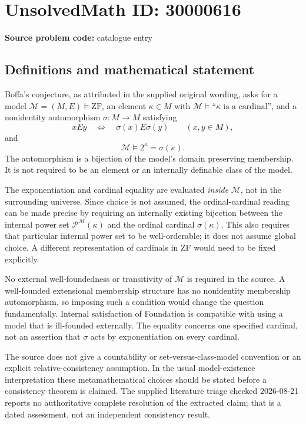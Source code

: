 \documentclass[11pt]{article}
\begin{document}
\section*{UnsolvedMath ID: 30000616}
\textbf{Source problem code:} catalogue entry
\subsection{Definitions and mathematical statement}
Boffa's conjecture, as attributed in the supplied original wording, asks for a model \(\mathcal M=(M,E)\models\mathrm{ZF}\), an element \(\kappa\in M\) with \(\mathcal M\models\text{``}\kappa\text{ is a cardinal''}\), and a nonidentity automorphism \(\sigma:M\to M\) satisfying
\[
xEy\quad\Longleftrightarrow\quad\sigma(x)E\sigma(y)
\qquad(x,y\in M),
\]
and
\[
\mathcal M\models 2^\kappa=\sigma(\kappa).
\]
The automorphism is a bijection of the model's domain preserving membership. It is not required to be an element or an internally definable class of the model.

The exponentiation and cardinal equality are evaluated \emph{inside} \(\mathcal M\), not in the surrounding universe. Since choice is not assumed, the ordinal-cardinal reading can be made precise by requiring an internally existing bijection between the internal power set \(\mathcal P^{\mathcal M}(\kappa)\) and the ordinal cardinal \(\sigma(\kappa)\). This also requires that particular internal power set to be well-orderable; it does not assume global choice. A different representation of cardinals in ZF would need to be fixed explicitly.

No external well-foundedness or transitivity of \(\mathcal M\) is required in the source. A well-founded extensional membership structure has no nonidentity membership automorphism, so imposing such a condition would change the question fundamentally. Internal satisfaction of Foundation is compatible with using a model that is ill-founded externally. The equality concerns one specified cardinal, not an assertion that \(\sigma\) acts by exponentiation on every cardinal.

The source does not give a countability or set-versus-class-model convention or an explicit relative-consistency assumption. In the usual model-existence interpretation these metamathematical choices should be stated before a consistency theorem is claimed. The supplied literature triage checked 2026-08-21 reports no authoritative complete resolution of the extracted claim; that is a dated assessment, not an independent consistency result.
\end{document}
